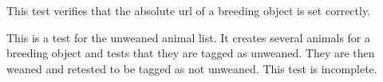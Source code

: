 \documentclass[letterpaper,10pt,english]{sphinxmanual}
\begin{document}
\begin{fulllineitems}

\begin{fulllineitems}
\label{api:animal.tests.BreedingModelTests.test_study_absolute_url}
This test verifies that the absolute url of a breeding object is set correctly.

\end{fulllineitems}



\begin{fulllineitems}
\label{api:animal.tests.BreedingModelTests.test_unweaned}
This is a test for the unweaned animal list.  It creates several animals for a breeding object and tests that they are tagged as unweaned.  They are then weaned and retested to be tagged as not unweaned.  This test is incomplete.

\end{fulllineitems}


\end{fulllineitems}


\end{document}
